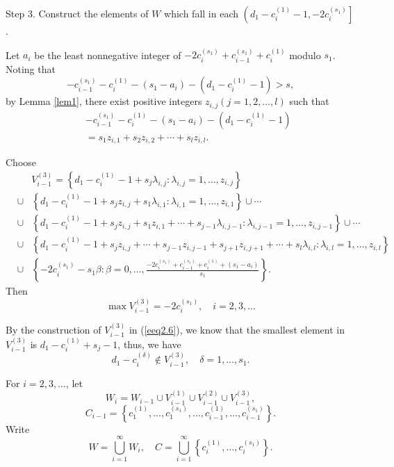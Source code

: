\documentclass[12pt]{article}
\numberwithin{equation}{section}
\begin{document}
Step 3. Construct the elements of $W$ which fall in each $\left(d_{1}-c_{i}^{(1)}-1, -2c_{i}^{(s_1)}\right]$.

Let $a_{i}$ be the least nonnegative integer of $-2c_{i}^{(s_1)}+c_{i-1}^{(s_1)}+c_{i}^{(1)}$ modulo $s_1$. Noting that $$-c_{i-1}^{(s_1)}-c_{i}^{(1)}-(s_1-a_i)-\left(d_{1}-c_{i}^{(1)}-1\right)>s,$$
by Lemma \ref{lem1}, there exist positive integers $z_{i,j}(j=1,2,\ldots,l)$ such that
\begin{eqnarray*}
&&-c_{i-1}^{(s_1)}-c_{i}^{(1)}-(s_1-a_i)-\left(d_{1}-c_{i}^{(1)}-1\right)\\
&&=s_1z_{i,1}+s_2z_{i,2}+\cdots+s_l z_{i,l}.\end{eqnarray*}

Choose
\begin{eqnarray}\label{eeq2.6}&&V_{i-1}^{(3)}=\left\{d_{1}-c_{i}^{(1)}-1+s_j\lambda_{i,j}:\lambda_{i,j}=1,\ldots,z_{i,j}\right\}\\ \nonumber
&\cup&\left\{d_{1}-c_{i}^{(1)}-1+s_j z_{i,j}+s_1\lambda_{i,1}:\lambda_{i,1}=1,\ldots,z_{i,1}\right\}\cup \cdots\\ \nonumber
&\cup&\left\{d_{1}-c_{i}^{(1)}-1+s_j z_{i,j}+s_1z_{i,1}+\cdots+s_{j-1}\lambda_{i,j-1}:\lambda_{i,j-1}=1,\ldots,z_{i,j-1}\right\}\cup \cdots\\ \nonumber
&\cup&\left\{d_{1}-c_{i}^{(1)}-1+s_j z_{i,j}+\cdots+s_{j-1}z_{i,j-1}+s_{j+1}z_{i,j+1}+\cdots+s_{l}\lambda_{i,l}:\lambda_{i,l}=1,\ldots,z_{i,l}\right\}\\ \nonumber
&\cup&\left\{-2c_{i}^{(s_1)}-s_1 \beta:\beta=0,\dots,\frac{-2c_{i}^{(s_1)}+c_{i-1}^{(s_1)}+c_{i}^{(1)}+(s_1-a_i)}{s_1}\right\}.\nonumber\end{eqnarray}
Then $$\max V_{i-1}^{(3)}=-2c_{i}^{(s_1)}, \quad i=2,3,\ldots$$

By the construction of $V_{i-1}^{(3)}$ in (\ref{eeq2.6}), we know that the smallest element in $V_{i-1}^{(3)}$ is $d_{1}-c_{i}^{(1)}+s_j-1$, thus, we have
\begin{equation}\label{iv-d}d_{1}-c_{i}^{(\delta)}\notin V_{i-1}^{(3)}, \quad \delta=1,\ldots,s_1.\tag{iv-d}\end{equation}

For $i=2,3,\ldots$, let
\begin{equation}\label{eq520}W_{i}=W_{i-1}\cup V_{i-1}^{(1)}\cup V_{i-1}^{(2)}\cup V_{i-1}^{(3)},\end{equation}
$$C_{i-1}=\left\{c_{1}^{(1)} ,\ldots,c_{1}^{(s_1)}, \ldots, c_{i-1}^{(1)}, \ldots,c_{i-1}^{(s_1)}\right\}.$$
Write $$W=\bigcup\limits_{i=1}^{\infty}W_{i}, \quad C=\bigcup\limits_{i=1}^{\infty}\left\{c_{i}^{(1)},\dots,c_{i}^{(s_1)}\right\}.$$
\end{document}
